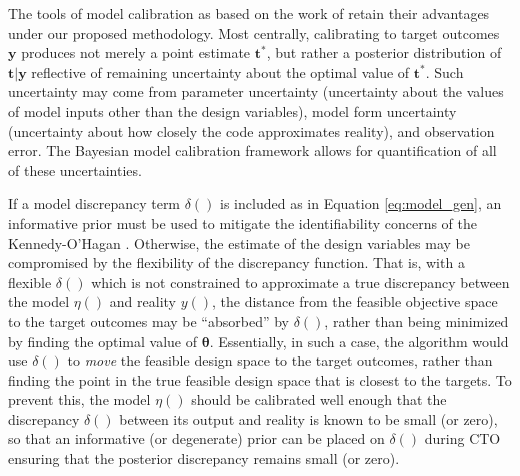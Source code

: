 \documentclass[12pt]{article}
\begin{document}
%
%
%
%
%

The tools of model calibration as based on the work of \cite{Kennedy2001} retain their advantages under our proposed methodology.
%
Most centrally, calibrating to target outcomes $\mathbf y$ produces not merely a point estimate $\mathbf t^*$, but rather a posterior distribution of $\mathbf t|\mathbf y$ reflective of remaining uncertainty about the optimal value of $\mathbf t^*$. 
%
Such uncertainty may come from parameter uncertainty (uncertainty about the values of model inputs other than the design variables), model form uncertainty (uncertainty about how closely the code approximates reality), and observation error. 
%
%
%
The Bayesian model calibration framework allows for quantification of all of these uncertainties. 
%

%
If a model discrepancy term $\delta()$ is included as in Equation \eqref{eq:model_gen}, an informative prior must be used to mitigate the identifiability concerns of the Kennedy-O'Hagan \citep{Bayarri2007,Tuo2016}.
%
Otherwise, the estimate of the design variables may be compromised by the flexibility of the discrepancy function.
%
That is, with a flexible $\delta()$ which is not constrained to approximate a true discrepancy between the model $\eta()$ and reality $y()$, the distance from the feasible objective space to the target outcomes may be ``absorbed'' by $\delta()$, rather than being minimized by finding the optimal value of $\boldsymbol\theta$.
%
Essentially, in such a case, the algorithm would use $\delta()$ to \emph{move} the feasible design space to the target outcomes, rather than finding the point in the true feasible design space that is closest to the targets.
%
To prevent this, the model $\eta()$ should be calibrated well enough that the discrepancy $\delta()$ between its output and reality is known to be small (or zero), so that an informative (or degenerate) prior can be placed on $\delta()$ during CTO ensuring that the posterior discrepancy remains small (or zero).
%
\end{document}
